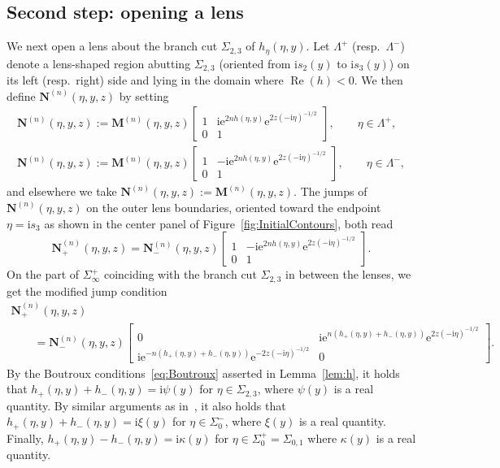 \subsection{Second step: opening a lens}
We next open a lens about the branch cut $\Sigma_{2,3}$ of $h_\eta(\eta,y)$. Let $\Lambda^+$ (resp.\ $\Lambda^-$) denote a lens-shaped region abutting $\Sigma_{2,3}$ (oriented from $\mathrm{i} s_2(y)$ to $\mathrm{i} s_3(y)$) on its left (resp.\ right) side and lying in the domain where $\operatorname{Re}(h)<0$. We then define $\mathbf{N}^{(n)}(\eta,y,z)$ by setting
\begin{gather*}
\mathbf{N}^{(n)}(\eta,y,z):=\mathbf{M}^{(n)}(\eta,y,z)\begin{bmatrix}1&\mathrm{i}\mathrm{e}^{2nh(\eta,y)}\mathrm{e}^{2z(-\mathrm{i}\eta)^{-1/2}}\\0&1\end{bmatrix},\qquad \eta\in\Lambda^+,
\\
\mathbf{N}^{(n)}(\eta,y,z):=\mathbf{M}^{(n)}(\eta,y,z)\begin{bmatrix}1&-\mathrm{i}\mathrm{e}^{2nh(\eta,y)}\mathrm{e}^{2z(-\mathrm{i}\eta)^{-1/2}}\\0&1\end{bmatrix},\qquad\eta\in\Lambda^-,
\end{gather*}
and elsewhere we take $\mathbf{N}^{(n)}(\eta,y,z):=\mathbf{M}^{(n)}(\eta,y,z)$. The jumps of $\mathbf{N}^{(n)}(\eta,y,z)$ on the outer lens boundaries, oriented toward the endpoint $\eta=\mathrm{i} s_3$ as shown in the center panel of Figure~\ref{fig:InitialContours}, both read
\begin{equation*}
\mathbf{N}^{(n)}_+(\eta,y,z)=\mathbf{N}^{(n)}_-(\eta,y,z)\begin{bmatrix}1&-\mathrm{i}\mathrm{e}^{2nh(\eta,y)}\mathrm{e}^{2z(-\mathrm{i}\eta)^{-1/2}}\\0&1\end{bmatrix}.
\end{equation*}
On the part of $\Sigma_\infty^+$ coinciding with the branch cut $\Sigma_{2,3}$ in between the lenses, we get the modified jump condition
\begin{gather*}
\mathbf{N}^{(n)}_+(\eta,y,z) \\
\qquad
=\mathbf{N}^{(n)}_-(\eta,y,z)\begin{bmatrix}0 & \mathrm{i}\mathrm{e}^{n(h_+(\eta,y)+h_-(\eta,y))}\mathrm{e}^{2z(-\mathrm{i}\eta)^{-1/2}}\\\mathrm{i}\mathrm{e}^{-n(h_+(\eta,y)+h_-(\eta,y))}\mathrm{e}^{-2z(-\mathrm{i}\eta)^{-1/2}} & 0\end{bmatrix}.
\end{gather*}
By the Boutroux conditions~\eqref{eq:Boutroux} asserted in Lemma~\ref{lem:h}, it holds that $h_+(\eta,y)+h_-(\eta,y)=\mathrm{i}\psi(y)$ for $\eta\in\Sigma_{2,3}$, where $\psi(y)$ is a real quantity. By similar arguments as in~\cite{BuckinghamM22}, it also holds that $h_+(\eta,y)+h_-(\eta,y)=\mathrm{i}\xi(y)$ for $\eta\in\Sigma_0^-$, where $\xi(y)$ is a real quantity. Finally, $h_+(\eta,y)-h_-(\eta,y)=\mathrm{i}\kappa(y)$ for $\eta\in\Sigma_0^+=\Sigma_{0,1}$ where $\kappa(y)$ is a real quantity.

